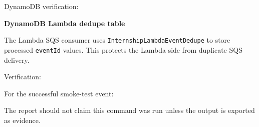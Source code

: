 DynamoDB verification:

\begin{Shaded}
\begin{Highlighting}[]
\end{Highlighting}
\end{Shaded}

\vspace{0.5em}\noindent\textbf{DynamoDB Lambda dedupe
table}\par

The Lambda SQS consumer uses \texttt{InternshipLambdaEventDedupe} to
store processed \texttt{eventId} values. This protects the Lambda side
from duplicate SQS delivery.

Verification:

\begin{Shaded}
\begin{Highlighting}[]
\DataTypeTok{\textbackslash{}}
  \DataTypeTok{\textbackslash{}}
\end{Highlighting}
\end{Shaded}

For the successful smoke-test event:

\begin{Shaded}
\begin{Highlighting}[]
\DataTypeTok{\textbackslash{}}
  \DataTypeTok{\textbackslash{}}
    \DataTypeTok{\textbackslash{}}
\end{Highlighting}
\end{Shaded}

The report should not claim this command was run unless the output is
exported as evidence.

